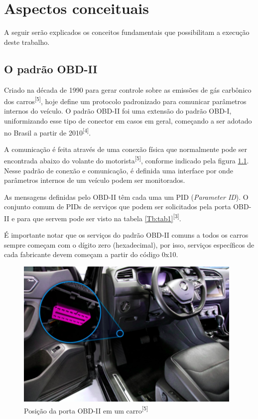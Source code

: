\chapter{Aspectos conceituais}
\label{CAP2}

A seguir serão explicados os conceitos fundamentais que possibilitam a execução deste trabalho. 


\section{O padrão OBD-II}

Criado na década de 1990 para gerar controle sobre as emissões de gás carbônico dos carros\textsuperscript{[5]}, hoje define um protocolo padronizado para comunicar parâmetros internos do veículo. O padrão OBD-II foi uma extensão do padrão OBD-I, uniformizando esse tipo de conector em casos em geral, começando a ser adotado no Brasil a partir de 2010\textsuperscript{[4]}.

A comunicação é feita através de uma conexão física que normalmente pode ser encontrada abaixo do volante do motorista\textsuperscript{[5]}, conforme indicado pela figura \ref{fig:obd2_conn}. Nesse padrão de conexão e comunicação, é definida uma interface por onde parâmetros internos de um veículo podem ser monitorados.

As mensagens definidas pelo OBD-II têm cada uma um PID (\textit{Parameter ID}). O conjunto comum de PIDs de serviços que podem ser solicitados pela porta OBD-II e para que servem pode ser visto na tabela \ref{Tb:tab1}\textsuperscript{[3]}.




É importante notar que os serviços do padrão OBD-II comuns a todos os carros sempre começam com o dígito zero (hexadecimal), por isso, serviços específicos de cada fabricante devem começam a partir do código 0x10.

\begin{figure}[hp]
    \centering
    
    \includegraphics[]{figures/localizacao_obd2.png}
    
    \caption{Posição da porta OBD-II em um carro\textsuperscript{[5]}}
    
    \label{fig:obd2_conn}
\end{figure}

